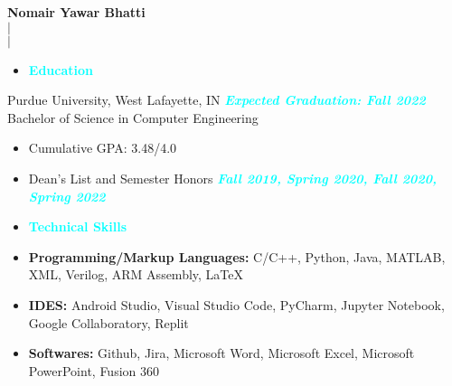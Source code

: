 \documentclass{article}
\begin{document}
\begin{center}
    \Large{\textbf{Nomair Yawar Bhatti \\}}
    \normalsize{ $\mid$  \\}
    \normalsize{ $\mid$  \\} 
\end{center}

\begin{itemize}[noitemsep, nolistsep, leftmargin = *]
    \item[\textcolor{cyan}{\ding{228}}]\Large{\textcolor{cyan}{\textbf{Education}}}
    \hrulefill
\end{itemize}
Purdue University, West Lafayette, IN \hfill \textit{\textcolor{cyan}{\textbf{Expected Graduation: Fall 2022}}} \\
Bachelor of Science in Computer Engineering
\begin{itemize}[noitemsep, nolistsep]
    \item Cumulative GPA: 3.48/4.0 
    \item Dean's List and Semester Honors \hfill \textit{\textcolor{cyan}{\textbf{Fall 2019, Spring 2020, Fall 2020, Spring 2022}}} \\
\end{itemize}

\begin{itemize}[noitemsep, nolistsep, leftmargin = *]
    \item[\textcolor{cyan}{\ding{228}}]\Large{\textcolor{cyan}{\textbf{Technical Skills}}}
    \hrulefill
\end{itemize}
\begin{itemize}[noitemsep, nolistsep, leftmargin = *]
    \item \textbf{Programming/Markup Languages:} C/C++, Python, Java, MATLAB, XML, Verilog, ARM Assembly, LaTeX
    \item \textbf{IDES:} Android Studio, Visual Studio Code, PyCharm, Jupyter Notebook, Google Collaboratory, Replit 
    \item \textbf{Softwares:} Github, Jira, Microsoft Word, Microsoft Excel, Microsoft PowerPoint, Fusion 360 \\
\end{itemize}
\end{document}
